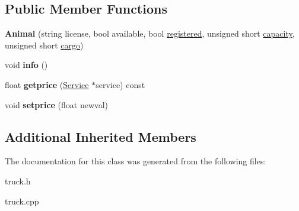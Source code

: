 \subsection*{Public Member Functions}
\begin{DoxyCompactItemize}
\item 
\mbox{\label{class_animal_afdae9b8c4716472196e8cd62c762f88a}} 
{\bfseries Animal} (string license, bool available, bool \hyperlink{class_truck_a80b8405cf7a15b236fef70116f99c4fb}{registered}, unsigned short \hyperlink{class_truck_a14541fad6d47c606ce4e1bd150a68a23}{capacity}, unsigned short \hyperlink{class_truck_a968fc6b1a6171a03e4254d6615da4ecd}{cargo})
\item 
\mbox{\label{class_animal_a1e99083943239209f4fbe79380ea5991}} 
void {\bfseries info} ()
\item 
\mbox{\label{class_animal_ae7d29605e1609b12836af44929b309e5}} 
float {\bfseries getprice} (\hyperlink{class_service}{Service} $\ast$service) const
\item 
\mbox{\label{class_animal_ac82fce4c39f299a7342e6b0b2b380a6c}} 
void {\bfseries setprice} (float newval)
\end{DoxyCompactItemize}
\subsection*{Additional Inherited Members}


The documentation for this class was generated from the following files\+:\begin{DoxyCompactItemize}
\item 
truck.\+h\item 
truck.\+cpp\end{DoxyCompactItemize}
